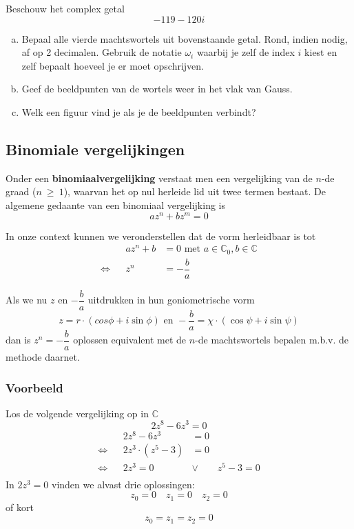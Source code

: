 \documentclass[12pt,twoside,a4paper]{article}
\begin{document}
\begin{oefening}
Beschouw het complex getal
$$-119-120i$$

\begin{enumerate}[(a)]
\item Bepaal alle vierde machtswortels uit bovenstaande getal. Rond, indien nodig, af op 2 decimalen. Gebruik de notatie $\omega_i$ waarbij je zelf de index $i$ kiest en zelf bepaalt hoeveel je er moet opschrijven.
\item Geef de beeldpunten van de wortels weer in het vlak van Gauss.
\item Welk een figuur vind je als je de beeldpunten verbindt?
\end{enumerate}
\end{oefening}

\subsection{Binomiale vergelijkingen}

Onder een {\bf binomiaalvergelijking} verstaat men een vergelijking van de $n$-de graad ($n~\geq~1$), waarvan het op nul herleide lid uit twee termen bestaat. De algemene gedaante van een binomiaal vergelijking is
\[az^n + bz^m=0\]

In onze context kunnen we veronderstellen dat de vorm herleidbaar is tot
\begin{align*}
     && az^n+b &= 0 \text{ met } a\in\mathbb{C}_0, b\in\mathbb{C}\\
  \Leftrightarrow &&    z^n  &= -\dfrac{b}{a}
\end{align*}

Als we nu $z$ en $-\dfrac{b}{a}$ uitdrukken in hun goniometrische vorm
\[z=r\cdot(cos\phi + i\sin\phi) \text{ en } -\dfrac{b}{a}=\chi \cdot ( \cos\psi + i\sin\psi )\]
dan is $z^n=-\dfrac{b}{a}$ oplossen equivalent met de $n$-de machtswortels bepalen m.b.v. de methode daarnet.

\subsubsection*{Voorbeeld}

Los de volgende vergelijking op in $\mathbb{C}$
\[2z^8-6z^3=0\]
\begin{align*}
     && 2z^8-6z^3 &= 0\\
  \Leftrightarrow && 2z^3 \cdot (z^5 - 3) &= 0\\
  \Leftrightarrow && 2z^3 = 0 \qquad &\vee \qquad z^5 - 3 = 0\\
\end{align*}
In $2z^3 = 0$ vinden we alvast drie oplossingen:
\[z_0 = 0 \quad z_1 = 0 \quad z_2 = 0\]
of kort
\[z_0 = z_1 = z_2 = 0\]
\end{document}

